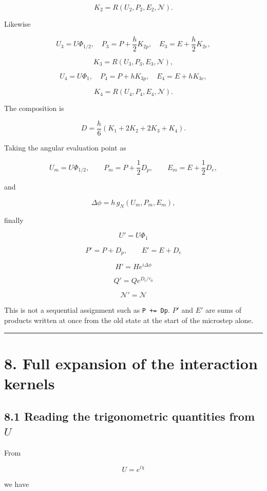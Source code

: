 \documentclass[
  a4paper,
]{article}
\begin{document}
\[
K_2=R(U_2,P_2,E_2,\mathcal N).
\]

Likewise

\[
U_3=U\Phi_{1/2},
\quad
P_3=P+\frac h2K_{2p},
\quad
E_3=E+\frac h2K_{2e},
\]

\[
K_3=R(U_3,P_3,E_3,\mathcal N),
\]

\[
U_4=U\Phi_1,
\quad
P_4=P+hK_{3p},
\quad
E_4=E+hK_{3e},
\]

\[
K_4=R(U_4,P_4,E_4,\mathcal N).
\]

The composition is

\[
\boxed{
D
=\frac h6
(K_1+2K_2+2K_3+K_4).
}
\]

Taking the angular evaluation point as

\[
U_m=U\Phi_{1/2},
\qquad
P_m=P+\frac12D_p,
\qquad
E_m=E+\frac12D_e,
\]

and

\[
\Delta\phi=h\,g_N(U_m,P_m,E_m),
\]

finally

\[
\boxed{
U'=U\Phi_1
}
\]

\[
\boxed{
P'=P+D_p,
\qquad
E'=E+D_e
}
\]

\[
\boxed{
H'=He^{i\Delta\phi}
}
\]

\[
\boxed{
Q'=Qe^{D_t/\tau_0}
}
\]

\[
\boxed{
\mathcal N'=\mathcal N
}
\]

This is not a sequential assignment such as \texttt{P\ +=\ Dp}. \(P'\)
and \(E'\) are sums of products written at once from the old state at
the start of the microstep alone.

\begin{center}\rule{0.5\linewidth}{0.5pt}\end{center}

\section{8. Full expansion of the interaction
kernels}\label{full-expansion-of-the-interaction-kernels}

\subsection{\texorpdfstring{8.1 Reading the trigonometric quantities
from
\(U\)}{8.1 Reading the trigonometric quantities from U}}\label{reading-the-trigonometric-quantities-from-u}

From

\[
U=e^{i\chi}
\]

we have
\end{document}
